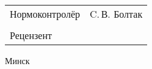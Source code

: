 \begin{titlepage}
\begin{center}
\begin{tabular}{ p{}p{} }
      Нормоконтролёр & C.\,В. Болтак\\
      & \\
      Рецензент &
    \end{tabular}
    
    \vfill
    {\normalsize Минск \currentYear{}}
  \end{center}
\end{titlepage}
